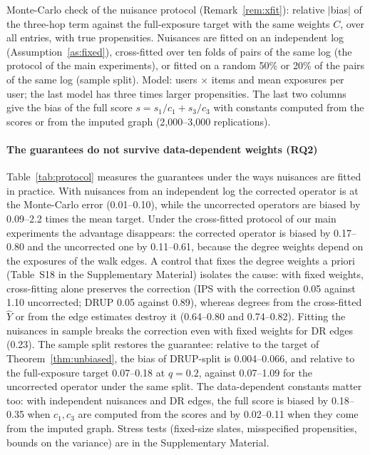 \documentclass[preprint,review,12pt,authoryear]{elsarticle}
\theoremstyle{definition}
\begin{document}
\begin{table}[t]\centering\small
\caption{Monte-Carlo check of the nuisance protocol (Remark~\ref{rem:xfit}): relative
$|$bias$|$ of the three-hop term against the full-exposure target with the same
weights $C$, over all entries, with true propensities. Nuisances are fitted on
an independent log (Assumption~\ref{as:fixed}), cross-fitted over ten folds of
pairs of the same log (the protocol of the main experiments), or fitted on a
random 50\% or 20\% of the pairs of the same log (sample split). Model: users
$\times$ items and mean exposures per user; the last model has three times larger
propensities. The last two columns give the bias of the full score
$s=s_1/c_1+s_3/c_3$ with constants computed from the scores or from the imputed
graph (2{,}000--3{,}000 replications).}\label{tab:protocol}
\begin{adjustbox}{max width=\textwidth}

\end{adjustbox}
\end{table}

\paragraph{The guarantees do not survive data-dependent weights (RQ2)}
Table~\ref{tab:protocol} measures the guarantees under the ways nuisances are
fitted in practice. With nuisances from an independent log the corrected operator is
at the Monte-Carlo error (0.01--0.10), while the uncorrected operators are biased by
0.09--2.2 times the mean target. Under the cross-fitted protocol of our main
experiments the advantage disappears: the corrected operator is biased by
0.17--0.80 and the uncorrected one by 0.11--0.61, because the degree weights
depend on the exposures of the walk edges. A control that fixes the degree weights
a priori (Table~S18 in the Supplementary Material) isolates the
cause: with fixed weights, cross-fitting alone preserves the correction (IPS with the
correction 0.05 against 1.10 uncorrected; DRUP 0.05 against 0.89), whereas degrees
from the cross-fitted $\hat Y$ or from the edge estimates destroy it (0.64--0.80 and
0.74--0.82). Fitting the nuisances in sample breaks the correction even with fixed
weights for DR edges (0.23). The sample split restores the guarantee: relative to
the target of Theorem~\ref{thm:unbiased}, the bias of DRUP-split is 0.004--0.066, and
relative to the full-exposure target 0.07--0.18 at $q=0.2$, against 0.07--1.09 for
the uncorrected operator under the same split. The data-dependent constants matter
too: with independent nuisances and DR edges, the full score is biased by 0.18--0.35
when $c_1,c_3$ are computed from the scores and by 0.02--0.11 when they come from the
imputed graph. Stress tests (fixed-size slates, misspecified propensities, bounds on
the variance) are in the Supplementary Material.
\end{document}
